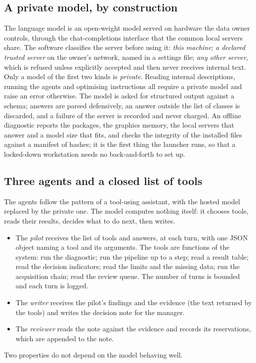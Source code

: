 \subsection{A private model, by construction}

The language model is an open-weight model served on hardware the data owner controls, through the
chat-completions interface that the common local servers share. The software classifies the server before using
it: \emph{this machine}; \emph{a declared trusted server} on the owner's network, named in a settings file;
\emph{any other server}, which is refused unless explicitly accepted and then never receives internal text. Only a
model of the first two kinds is \emph{private}. Reading internal descriptions, running the agents and optimising
instructions all require a private model and raise an error otherwise. The model is asked for structured output
against a schema; answers are parsed defensively, an answer outside the list of classes is discarded, and a failure
of the server is recorded and never charged. An offline diagnostic reports the packages, the graphics memory, the
local servers that answer and a model size that fits, and checks the integrity of the installed files against a
manifest of hashes; it is the first thing the launcher runs, so that a locked-down workstation needs no
back-and-forth to set up.

\subsection{Three agents and a closed list of tools}

The agents follow the pattern of a tool-using assistant, with the hosted model replaced by the private one. The
model computes nothing itself: it chooses tools, reads their results, decides what to do next, then writes.
\begin{itemize}
\item The \emph{pilot} receives the list of tools and answers, at each turn, with one JSON object naming a tool and
  its arguments. The tools are functions of the system: run the diagnostic; run the pipeline up to a step; read a
  result table; read the decision indicators; read the limits and the missing data; run the acquisition chain; read
  the review queue. The number of turns is bounded and each turn is logged.
\item The \emph{writer} receives the pilot's findings and the evidence (the text returned by the tools) and writes
  the decision note for the manager.
\item The \emph{reviewer} reads the note against the evidence and records its reservations, which are appended to
  the note.
\end{itemize}
Two properties do not depend on the model behaving well.

